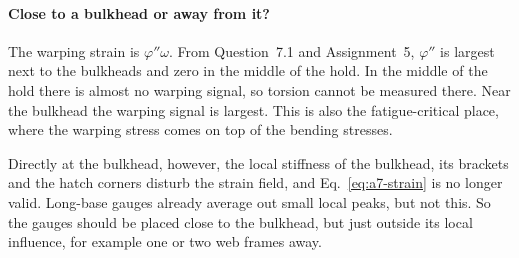 \paragraph{Close to a bulkhead or away from it?} The warping strain is $\varphi''\omega$. From Question~7.1 and Assignment~5, $\varphi''$ is largest next to the bulkheads and zero in the middle of the hold. In the middle of the hold there is almost no warping signal, so torsion cannot be measured there. Near the bulkhead the warping signal is largest. This is also the fatigue-critical place, where the warping stress comes on top of the bending stresses.

Directly at the bulkhead, however, the local stiffness of the bulkhead, its brackets and the hatch corners disturb the strain field, and Eq.~\ref{eq:a7-strain} is no longer valid. Long-base gauges already average out small local peaks, but not this. So the gauges should be placed close to the bulkhead, but just outside its local influence, for example one or two web frames away.

